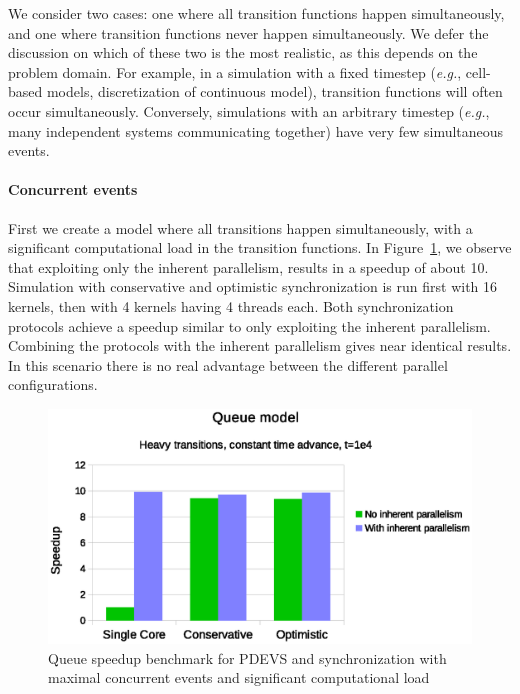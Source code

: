 We consider two cases: one where all transition functions happen simultaneously, and one where transition functions never happen simultaneously.
We defer the discussion on which of these two is the most realistic, as this depends on the problem domain.
For example, in a simulation with a fixed timestep (\textit{e.g.}, cell-based models, discretization of continuous model), transition functions will often occur simultaneously.
Conversely, simulations with an arbitrary timestep (\textit{e.g.}, many independent systems communicating together) have very few simultaneous events.

\paragraph{Concurrent events}
First we create a model where all transitions happen simultaneously, with a significant computational load in the transition functions.
In Figure~\ref{fig:psim_plot_fixed_sleep}, we observe that exploiting only the inherent parallelism, results in a speedup of about 10.  
Simulation with conservative and optimistic synchronization is run first with 16 kernels, then with 4 kernels having 4 \pSim threads each. 
Both synchronization protocols achieve a speedup similar to only exploiting the inherent parallelism.
Combining the protocols with the inherent parallelism gives near identical results.
In this scenario there is no real advantage between the different parallel configurations.

\begin{figure}
	\center
	\includegraphics[width=\columnwidth]{fig/pdevs_fixed_sleep.eps}
	\caption{Queue speedup benchmark for PDEVS and synchronization with maximal concurrent events and significant computational load}
	\label{fig:psim_plot_fixed_sleep}
\end{figure}

